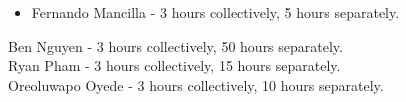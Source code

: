 \documentclass[11pt]{article}
\begin{document}
\begin{itemize}
  \item Fernando Mancilla - 3 hours collectively, 5 hours separately.
\end{itemize}

Ben Nguyen - 3 hours collectively, 50 hours separately.\\
Ryan Pham - 3 hours collectively, 15 hours separately.\\
Oreoluwapo Oyede - 3 hours collectively, 10 hours separately.
\end{document}
